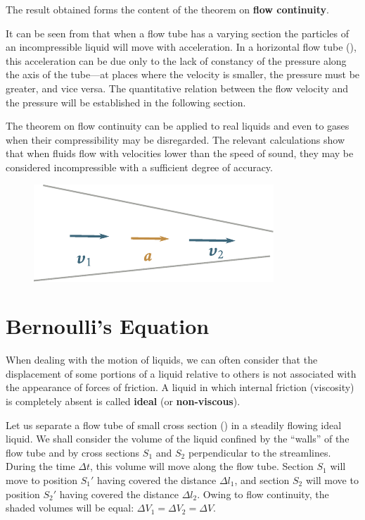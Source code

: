 \noindent
The result obtained forms the content of the theorem on \textbf{flow continuity}.

It can be seen from  that when a flow tube has a varying section the particles of an incompressible liquid will move with acceleration. In a horizontal flow tube (), this acceleration can be due only to the lack of constancy of the pressure along the axis of the tube---at places where the velocity is smaller, the pressure must be greater, and vice versa. The quantitative relation between the flow velocity and the pressure will be established in the following section.

The theorem on flow continuity can be applied to real liquids and even to gases when their compressibility may be disregarded. The relevant calculations show that when fluids flow with velocities lower than the speed of sound, they may be considered incompressible with a sufficient degree of accuracy.

\begin{figure}[t]
	\begin{center}
		\includegraphics[scale=1.0]{figures/ch_09/fig_9_4.pdf}
		\caption[]{}
		\label{fig:9_4}
	\end{center}
	\vspace{-0.8cm}
\end{figure}

\section{Bernoulli's Equation}\label{sec:9_2}

When dealing with the motion of liquids, we can often consider that the displacement of some portions of a liquid relative to others is not associated with the appearance of forces of friction. A liquid in which internal friction (viscosity) is completely absent is called \textbf{ideal} (or \textbf{non-viscous}).

Let us separate a flow tube of small cross section () in a steadily flowing ideal liquid. We shall consider the volume of the liquid confined by the ``walls'' of the flow tube and by cross sections $S_1$ and $S_2$ perpendicular to the streamlines. During the time $\Delta t$, this volume will move along the flow tube. Section $S_1$ will move to position $S_1'$ having covered the distance $\Delta l_1$, and section $S_2$ will move to position $S_2'$ having covered the distance $\Delta l_2$. Owing to flow continuity, the shaded volumes will be equal: $\Delta V_1 = \Delta V_2 = \Delta V$.

